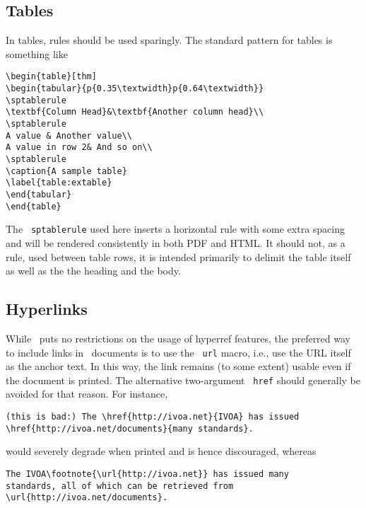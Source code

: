 \documentclass[11pt,a4paper]{ivoa}
\newcommand{\texword}[1]{\texttt{\color{texcolor} #1}}
\begin{document}
\subsection{Tables}

In tables, rules should be used sparingly.  The standard pattern for tables is
something like

\begin{lstlisting}
\begin{table}[thm]
\begin{tabular}{p{0.35\textwidth}p{0.64\textwidth}}
\sptablerule
\textbf{Column Head}&\textbf{Another column head}\\
\sptablerule
A value & Another value\\
A value in row 2& And so on\\
\sptablerule
\caption{A sample table}
\label{table:extable}
\end{tabular}
\end{table}
\end{lstlisting}

The \texword{sptablerule} used here inserts a horizontal rule with some
extra spacing and will be rendered consistently in both PDF and HTML.
It should not, as a rule, used between table rows, it is intended
primarily to delimit the table itself as well as the the heading and the
body.

\subsection{Hyperlinks}

While \ivoatex\ puts no restrictions on the usage of hyperref features,
the preferred way to include links in \ivoatex\ documents is to use the
\texword{url} macro, i.e., use the URL itself as the anchor text.  In
this way, the link remains (to some extent) usable even if the document
is printed.  The alternative two-argument \texword{href} should
generally be avoided for that reason.  For instance,

\begin{lstlisting}
(this is bad:) The \href{http://ivoa.net}{IVOA} has issued
\href{http://ivoa.net/documents}{many standards}.
\end{lstlisting}

would severely degrade when printed and is hence discouraged, whereas

\begin{lstlisting}
The IVOA\footnote{\url{http://ivoa.net}} has issued many 
standards, all of which can be retrieved from 
\url{http://ivoa.net/documents}.
\end{lstlisting}
\end{document}
